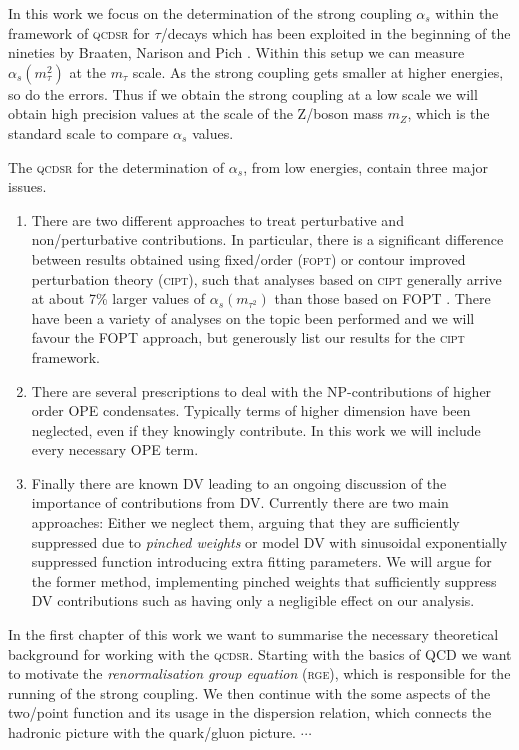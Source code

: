 \documentclass[../../index.tex]{subfiles}
\begin{document}
In this work we focus on the determination of the strong coupling $\alpha_s$
within the framework of \textsc{qcdsr} for $\tau$\-/decays which has been
exploited in the beginning of the nineties by Braaten, Narison and Pich
\cite{Braaten1991}. Within this setup we can measure $\alpha_s(m_\tau^2)$ at the
$m_\tau$ scale. As the strong coupling gets smaller at higher energies, so do
the errors. Thus if we obtain the strong coupling at a low scale we will obtain
high precision values at the scale of the Z\-/boson mass $m_Z$, which is the
standard scale to compare $\alpha_s$ values.

The \textsc{qcdsr} for the determination of $\alpha_s$, from low energies,
contain three major issues.
\begin{enumerate}
\item There are two different approaches to treat perturbative and
  non\-/perturbative contributions. In particular, there is a significant
  difference between results obtained using fixed\-/order (\textsc{fopt}) or
  contour improved perturbation theory (\textsc{cipt}), such that analyses based
  on \textsc{cipt} generally arrive at about 7\% larger values of
  $\alpha_s(m_{\tau^2})$ than those based on FOPT \cite{PDG2018}. There have
  been a variety of analyses on the topic been performed
  \cite{Pich2013,Caprini2009,Jamin2005} and we will favour the FOPT approach,
  but generously list our results for the \textsc{cipt} framework.

\item There are several prescriptions to deal with the NP-contributions of
  higher order OPE condensates. Typically terms of higher dimension have been
  neglected, even if they knowingly contribute. In this work we will include
  every necessary OPE term.

\item Finally there are known DV leading to an ongoing discussion of the
  importance of contributions from DV. Currently there are two main approaches:
  Either we neglect them, arguing that they are sufficiently suppressed due to
  \textit{pinched weights} \cite{Pich2016} or model DV with sinusoidal
  exponentially suppressed function \cite{Cata2008,Boito2011a,Boito2014}
  introducing extra fitting parameters. We will argue for the former method,
  implementing pinched weights that sufficiently suppress DV contributions such
  as having only a negligible effect on our analysis.
\end{enumerate}


In the first chapter of this work we want to summarise the necessary theoretical
background for working with the \textsc{qcdsr}. Starting with the basics of QCD
we want to motivate the \textit{renormalisation group equation} (\textsc{rge}),
which is responsible for the running of the strong coupling. We then continue
with the some aspects of the two\-/point function and its usage in the
dispersion relation, which connects the hadronic picture with the quark\-/gluon
picture. $\cdots$
\end{document}
